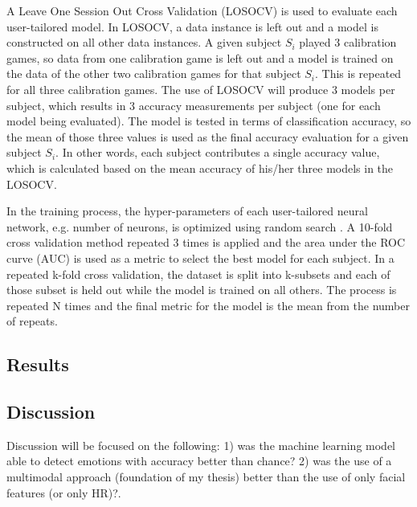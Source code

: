 A Leave One Session Out Cross Validation (LOSOCV) is used to evaluate each user-tailored model. In LOSOCV, a data instance is left out and a model is constructed on all other data instances. A given subject $S_i$ played 3 calibration games, so data from one calibration game is left out and a model is trained on the data of the other two calibration games for that subject $S_i$. This is repeated for all three calibration games. The use of LOSOCV will produce 3 models per subject, which results in 3 accuracy measurements per subject (one for each model being evaluated). The model is tested in terms of classification accuracy, so the mean of those three values is used as the final accuracy evaluation for a given subject $S_i$. In other words, each subject contributes a single accuracy value, which is calculated based on the mean accuracy of his/her three models in the LOSOCV.

In the training process, the hyper-parameters of each user-tailored neural network, e.g. number of neurons, is optimized using random search \parencite{bergstra2012random}. A 10-fold cross validation method repeated 3 times is applied and the area under the ROC curve (AUC) is used as a metric to select the best model for each subject. In a repeated k-fold cross validation, the dataset is split into k-subsets and each of those subset is held out while the model is trained on all others. The process is repeated N times and the final metric for the model is the mean from the number of repeats.





\subsection{Results}

\subsection{Discussion}
Discussion will be focused on the following: 1) was the machine learning model able to detect emotions with accuracy better than chance? 2) was the use of a multimodal approach (foundation of my thesis) better than the use of only facial features (or only HR)?.

